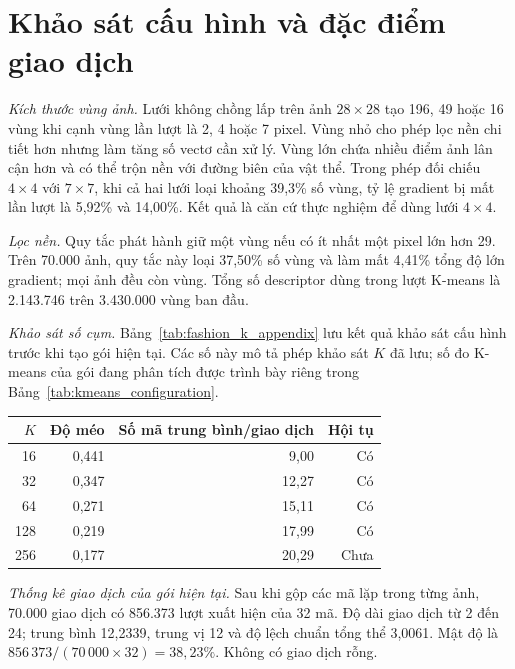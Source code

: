 \clearpage
\appendices

\section{Khảo sát cấu hình và đặc điểm giao dịch}
\label{app:fashion_configuration}

\textit{Kích thước vùng ảnh.}
Lưới không chồng lấp trên ảnh $28\times28$ tạo 196, 49 hoặc 16 vùng khi cạnh vùng lần lượt là 2, 4 hoặc 7 pixel. Vùng nhỏ cho phép lọc nền chi tiết hơn nhưng làm tăng số vectơ cần xử lý. Vùng lớn chứa nhiều điểm ảnh lân cận hơn và có thể trộn nền với đường biên của vật thể. Trong phép đối chiếu $4\times4$ với $7\times7$, khi cả hai lưới loại khoảng 39,3\% số vùng, tỷ lệ gradient bị mất lần lượt là 5,92\% và 14,00\%. Kết quả là căn cứ thực nghiệm để dùng lưới $4\times4$.

\textit{Lọc nền.}
Quy tắc phát hành giữ một vùng nếu có ít nhất một pixel lớn hơn 29. Trên 70.000 ảnh, quy tắc này loại 37,50\% số vùng và làm mất 4,41\% tổng độ lớn gradient; mọi ảnh đều còn vùng. Tổng số descriptor dùng trong lượt K-means là 2.143.746 trên 3.430.000 vùng ban đầu.

\textit{Khảo sát số cụm.}
Bảng~\ref{tab:fashion_k_appendix} lưu kết quả khảo sát cấu hình trước khi tạo gói hiện tại. Các số này mô tả phép khảo sát $K$ đã lưu; số đo K-means của gói đang phân tích được trình bày riêng trong Bảng~\ref{tab:kmeans_configuration}.

\begin{center}
    \label{tab:fashion_k_appendix}
    \footnotesize
    \begin{tabular}{@{}rrrr@{}}
        \toprule
        $K$ & Độ méo & Số mã trung bình/giao dịch & Hội tụ \\
        \midrule
        16  & 0,441 &  9,00 & Có \\
        32  & 0,347 & 12,27 & Có \\
        64  & 0,271 & 15,11 & Có \\
        128 & 0,219 & 17,99 & Có \\
        256 & 0,177 & 20,29 & Chưa \\
        \bottomrule
    \end{tabular}
\end{center}

\textit{Thống kê giao dịch của gói hiện tại.}
Sau khi gộp các mã lặp trong từng ảnh, 70.000 giao dịch có 856.373 lượt xuất hiện của 32 mã. Độ dài giao dịch từ 2 đến 24; trung bình 12,2339, trung vị 12 và độ lệch chuẩn tổng thể 3,0061. Mật độ là $856\,373/(70\,000\times32)=38,23\%$. Không có giao dịch rỗng.

